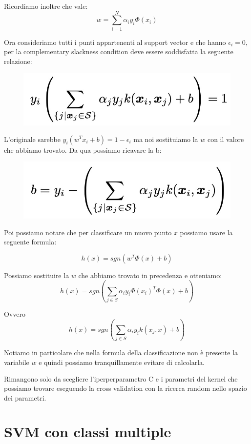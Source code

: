 \documentclass[14pt]{extreport}
\begin{document}
Ricordiamo inoltre che vale: $$w = \sum_{i=1}^N \alpha_i y_i \Phi(x_i)$$

Ora consideriamo tutti i punti appartenenti al support vector e che hanno $\epsilon_i = 0$, per la complementary slackness condition deve essere
soddisfatta la seguente relazione:

\begin{figure}[H]
	\centering
	\includegraphics[width=0.7\linewidth]{352.jpeg}
\end{figure}

L'originale sarebbe $y_i(w^T x_i +b) = 1 - \epsilon_i$ ma noi sostituiamo la $w$ con il valore che abbiamo trovato. Da qua possiamo ricavare la b:

\begin{figure}[H]
	\centering
	\includegraphics[width=0.7\linewidth]{353.jpeg}
\end{figure}

Poi possiamo notare che per classificare un nuovo punto \textbf{$x$} possiamo usare la seguente formula:

$$h(x) = sgn(w^T\Phi(x)+b)$$

Possiamo sostituire la $w$ che abbiamo trovato in precedenza e otteniamo: $$h(x) = sgn(\sum_{j \in S}\alpha_i y_i \Phi(x_i)^T \Phi(x) + b)$$

Ovvero $$h(x) = sgn(\sum_{j \in S}\alpha_i y_i k(x_j, x) + b)$$

Notiamo in particolare che nella formula della classificazione non è presente la variabile $w$ e quindi possiamo tranquillamente evitare di
calcolarla.

Rimangono solo da scegliere l'iperperparametro C e i parametri del kernel che possiamo trovare eseguendo la cross validation con la ricerca random
nello spazio dei parametri.

\section{SVM con classi multiple}
\end{document}

